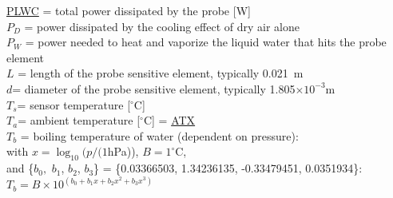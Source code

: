 \documentclass[
  english,
]{book}
\begin{document}
\protect\hyperlink{plwc}{PLWC} = total power dissipated by the probe
{[}W{]}\\
\(P_{D}\) = power
dissipated
by the cooling effect of dry air alone\\
\(P_{W}\) = power needed to heat and vaporize the liquid water that hits
the probe element\\
\(L\) = length of
the probe sensitive element,
typically 0.021~m\\
\(d\)= diameter of the probe sensitive
element, typically 1.805\(\times10^{-3}\)m\\
\(T_{s}\)= sensor
temperature
{[}\(^{\circ}\)C{]}\\
\(T_{a}\)= ambient temperature {[}\(^{\circ}\)C{]} =
\href{./4-the-state-of-the-atmosphere.html\#ambient-t}{ATX}\\
\(T_{b}\) =
boiling temperature of water (dependent on pressure):\\
\hspace*{0.333em}\hspace*{0.333em}\hspace*{0.333em}\hspace*{0.333em}\hspace*{0.333em}\hspace*{0.333em}\hspace*{0.333em}\hspace*{0.333em}\hspace*{0.333em}with
\(x=\log_{10}(p/(1\)hPa)), \(B=1^{\circ}\)C,\\
\hspace*{0.333em}\hspace*{0.333em}\hspace*{0.333em}\hspace*{0.333em}\hspace*{0.333em}\hspace*{0.333em}\hspace*{0.333em}\hspace*{0.333em}\hspace*{0.333em}and
\{\(b_{0},\) \(b_{1}\), \(b_{2}\), \(b_{3}\)\} = \{0.03366503,
1.34236135, -0.33479451, 0.0351934\}:\\
\hspace*{0.333em}\hspace*{0.333em}\hspace*{0.333em}\hspace*{0.333em}\hspace*{0.333em}\hspace*{0.333em}\hspace*{0.333em}\hspace*{0.333em}\hspace*{0.333em}\hspace*{0.333em}\(T_{b}=B\times10^{(b_{0}+b_{1}x+b_{2}x^{2}+b_{3}x^{3})}\)\\
\end{document}
